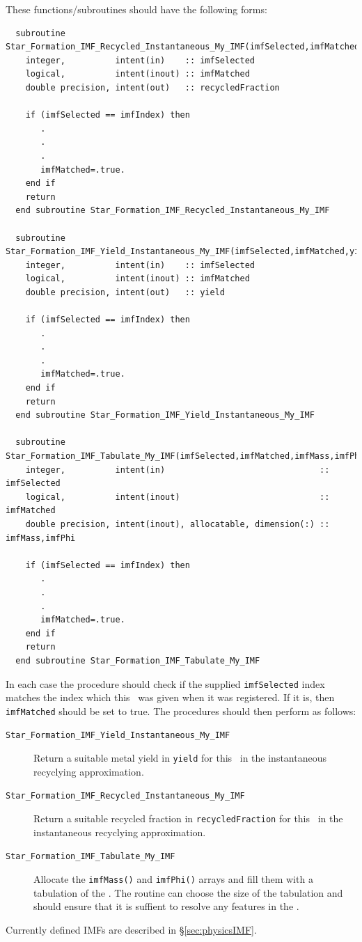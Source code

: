 These functions/subroutines should have the following forms:
\begin{verbatim}
  subroutine Star_Formation_IMF_Recycled_Instantaneous_My_IMF(imfSelected,imfMatched,recycledFraction)
    integer,          intent(in)    :: imfSelected
    logical,          intent(inout) :: imfMatched
    double precision, intent(out)   :: recycledFraction

    if (imfSelected == imfIndex) then
       .
       .
       .
       imfMatched=.true.
    end if
    return
  end subroutine Star_Formation_IMF_Recycled_Instantaneous_My_IMF

  subroutine Star_Formation_IMF_Yield_Instantaneous_My_IMF(imfSelected,imfMatched,yield)
    integer,          intent(in)    :: imfSelected
    logical,          intent(inout) :: imfMatched
    double precision, intent(out)   :: yield

    if (imfSelected == imfIndex) then
       .
       .
       .
       imfMatched=.true.
    end if
    return
  end subroutine Star_Formation_IMF_Yield_Instantaneous_My_IMF

  subroutine Star_Formation_IMF_Tabulate_My_IMF(imfSelected,imfMatched,imfMass,imfPhi)
    integer,          intent(in)                               :: imfSelected
    logical,          intent(inout)                            :: imfMatched
    double precision, intent(inout), allocatable, dimension(:) :: imfMass,imfPhi

    if (imfSelected == imfIndex) then
       .
       .
       .
       imfMatched=.true.
    end if
    return
  end subroutine Star_Formation_IMF_Tabulate_My_IMF
\end{verbatim}
In each case the procedure should check if the supplied {\tt imfSelected} index matches the index which this \IMF\ was given when it was registered. If it is, then {\tt imfMatched} should be set to true. The procedures should then perform as follows:
\begin{description}
 \item [{\tt Star\_Formation\_IMF\_Yield\_Instantaneous\_My\_IMF}] Return a suitable metal yield in {\tt yield} for this \IMF\ in the instantaneous recyclying approximation.
 \item [{\tt Star\_Formation\_IMF\_Recycled\_Instantaneous\_My\_IMF}] Return a suitable recycled fraction in {\tt recycledFraction} for this \IMF\ in the instantaneous recyclying approximation.
 \item [{\tt Star\_Formation\_IMF\_Tabulate\_My\_IMF}] Allocate the {\tt imfMass()} and {\tt imfPhi()} arrays and fill them with a tabulation of the \IMF. The routine can choose the size of the tabulation and should ensure that it is suffient to resolve any features in the \IMF.
\end{description}
Currently defined IMFs are described in \S\ref{sec:physicsIMF}.

